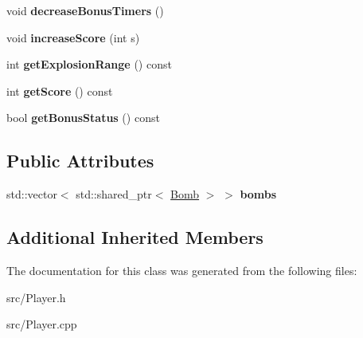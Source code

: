 \begin{DoxyCompactItemize}
void {\bfseries decrease\+Bonus\+Timers} ()
\item 
\mbox{\label{class_player_a42cbeed0ae27284ea3be2598ece09ebf}} 
void {\bfseries increase\+Score} (int s)
\item 
\mbox{\label{class_player_a3d472e5560e194b6baac0d5a99aed5f5}} 
int {\bfseries get\+Explosion\+Range} () const
\item 
\mbox{\label{class_player_acbdb2bae8d732157af0ca5f5438a2b63}} 
int {\bfseries get\+Score} () const
\item 
\mbox{\label{class_player_ac3a8da5e226c81119264d5283418bfad}} 
bool {\bfseries get\+Bonus\+Status} () const
\end{DoxyCompactItemize}
\subsection*{Public Attributes}
\begin{DoxyCompactItemize}
\item 
\mbox{\label{class_player_a3da77afe7ba343e15960cf5fee2e3b2e}} 
std\+::vector$<$ std\+::shared\+\_\+ptr$<$ \mbox{\hyperlink{class_bomb}{Bomb}} $>$ $>$ {\bfseries bombs}
\end{DoxyCompactItemize}
\subsection*{Additional Inherited Members}


The documentation for this class was generated from the following files\+:\begin{DoxyCompactItemize}
\item 
src/Player.\+h\item 
src/Player.\+cpp\end{DoxyCompactItemize}
